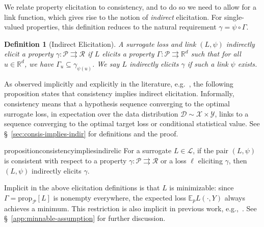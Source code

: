 \documentclass[11pt]{article} %
\newcommand{\Comments}{1}
\newcommand{\mytodo}[2]{\ifnum\Comments=1%
	\todo[linecolor=#1!80!black,backgroundcolor=#1,bordercolor=#1!80!black]{#2}\fi}
\newcommand{\btw}[1]{}%
\newcommand{\reals}{\mathbb{R}}
\newcommand{\prop}[2][\mathcal{P}]{\mathrm{prop}_{#1}[#2]}
\newcommand{\D}{\mathcal{D}}
\newcommand{\E}{\mathbb{E}}
\renewcommand{\L}{\mathcal{L}}
\newcommand{\R}{\mathcal{R}}
\renewcommand{\P}{\mathcal{P}}
\newcommand{\X}{\mathcal{X}}
\newcommand{\Y}{\mathcal{Y}}
\newcommand{\exploss}[3]{\E_{#3} #1(#2,Y)}
\newcommand{\toto}{\rightrightarrows}
\newtheorem{definition}{Definition}
\begin{document}
We relate property elicitation to consistency, and to do so we need to allow for a link function, which gives rise to the notion of \emph{indirect} elicitation.
For single-valued properties, this definition reduces to the natural requirement $\gamma = \psi \circ \Gamma$.
\begin{definition}[Indirect Elicitation]\label{def:indirectly-elicits}
	A surrogate loss and link $(L, \psi)$ \emph{indirectly elicit} a property $\gamma:\P \toto \R$ if $L$ elicits a property $\Gamma: \P \toto \reals^d$ such that for all $u \in \reals^d$, we have $\Gamma_u \subseteq \gamma_{\psi(u)}$.
	We say $L$ \emph{indirectly elicits} $\gamma$ if such a link $\psi$ exists.
  \btw{interesting discussion of set-valued properties commented out; revive later!}
\end{definition}

As observed implicitly and explicitly in the literature, e.g.~\citep{steinwart2008support,agarwal2015consistent}, the following proposition states that consistency implies indirect elicitation.
Informally, consistency means that a hypothesis sequence converging to the optimal surrogate loss, in expectation over the data distribution $\D \sim \X \times \Y$, links to a sequence converging to the optimal target loss or conditional statistical value.
See \S~\ref{sec:consis-implies-indir} for definitions and the proof.

\begin{restatable}{proposition}{consistencyimpliesindirelic}\label{thm:consistent-implies-indir-elic}
	For a surrogate $L \in \L$, if the pair $(L, \psi)$ is consistent with respect to a property $\gamma: \P \toto \R$ or a loss $\ell$ eliciting $\gamma$, then $(L, \psi)$ indirectly elicits $\gamma$.
\end{restatable}


Implicit in the above elicitation definitions is that $L$ is minimizable: since $\Gamma = \prop[\P]{L}$ is nonempty everywhere, the expected loss $\exploss{L}{\cdot}{p}$ always achieves a minimum.
This restriction is also implicit in previous work, e.g.,~\citep{agarwal2015consistent}.
See \S~\ref{app:minnable-assumption} for further discussion.
\end{document}
